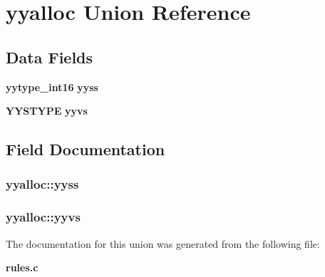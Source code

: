 \section{yyalloc Union Reference}
\label{unionyyalloc}
\subsection*{Data Fields}
\begin{CompactItemize}
\item 
{\bf yytype\_\-int16} {\bf yyss}
\item 
{\bf YYSTYPE} {\bf yyvs}
\end{CompactItemize}


\subsection{Field Documentation}
\subsubsection[{yyss}]{ {\bf yyalloc::yyss}}\label{unionyyalloc_ad44e4a724037e32eeb58333c516bb45}


\subsubsection[{yyvs}]{ {\bf yyalloc::yyvs}}\label{unionyyalloc_9494cc8d8cd0eba1b44ca20fe89de5d2}




The documentation for this union was generated from the following file:\begin{CompactItemize}
\item 
{\bf rules.c}\end{CompactItemize}
